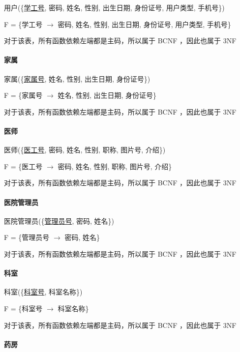 \documentclass{article}
\begin{document}
用户(\{\underline{学工号}, 密码, 姓名, 性别, 出生日期, 身份证号, 用户类型, 手机号\})

F = \{学工号 $\rightarrow$ 密码, 姓名, 性别, 出生日期, 身份证号, 用户类型, 手机号\}

对于该表，所有函数依赖左端都是主码，所以属于 BCNF ，因此也属于 3NF 

\paragraph{家属}

家属(\{\underline{家属号}, 姓名, 性别, 出生日期, 身份证号\})

F = \{家属号 $\rightarrow$ 姓名, 性别, 出生日期, 身份证号\}

对于该表，所有函数依赖左端都是主码，所以属于 BCNF ，因此也属于 3NF

\paragraph{医师}

医师(\{\underline{医工号}, 密码, 姓名, 性别, 职称, 图片号, 介绍\})

F = \{医工号 $\rightarrow$ 密码, 姓名, 性别, 职称, 图片号, 介绍\}

对于该表，所有函数依赖左端都是主码，所以属于 BCNF ，因此也属于 3NF

\paragraph{医院管理员}

医院管理员(\{\underline{管理员号}, 密码, 姓名\})

F = \{管理员号 $\rightarrow$ 密码, 姓名\}

对于该表，所有函数依赖左端都是主码，所以属于 BCNF ，因此也属于 3NF

\paragraph{科室}

科室(\{\underline{科室号}, 科室名称\})

F = \{科室号 $\rightarrow$ 科室名称\}

对于该表，所有函数依赖左端都是主码，所以属于 BCNF ，因此也属于 3NF

\paragraph{药房}
\end{document}
